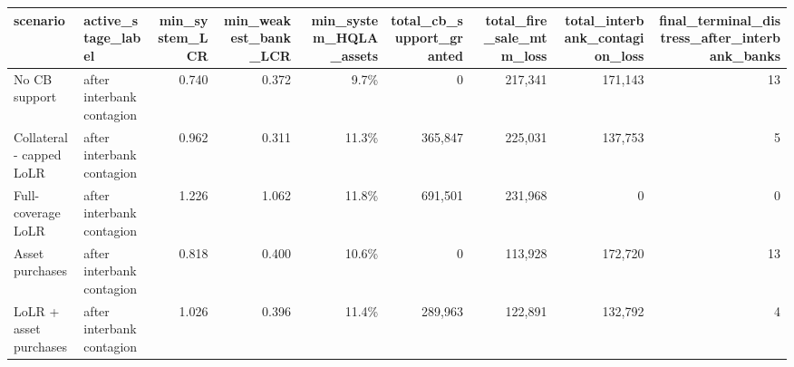 \begin{tabular}{llrrrrrrr}
\toprule
scenario & active_stage_label & min_system_LCR & min_weakest_bank_LCR & min_system_HQLA_assets & total_cb_support_granted & total_fire_sale_mtm_loss & total_interbank_contagion_loss & final_terminal_distress_after_interbank_banks \\
\midrule
No CB support & after interbank contagion & 0.740 & 0.372 & 9.7\% & 0 & 217,341 & 171,143 & 13 \\
Collateral- capped LoLR & after interbank contagion & 0.962 & 0.311 & 11.3\% & 365,847 & 225,031 & 137,753 & 5 \\
Full-coverage LoLR & after interbank contagion & 1.226 & 1.062 & 11.8\% & 691,501 & 231,968 & 0 & 0 \\
Asset purchases & after interbank contagion & 0.818 & 0.400 & 10.6\% & 0 & 113,928 & 172,720 & 13 \\
LoLR + asset purchases & after interbank contagion & 1.026 & 0.396 & 11.4\% & 289,963 & 122,891 & 132,792 & 4 \\
\bottomrule
\end{tabular}
